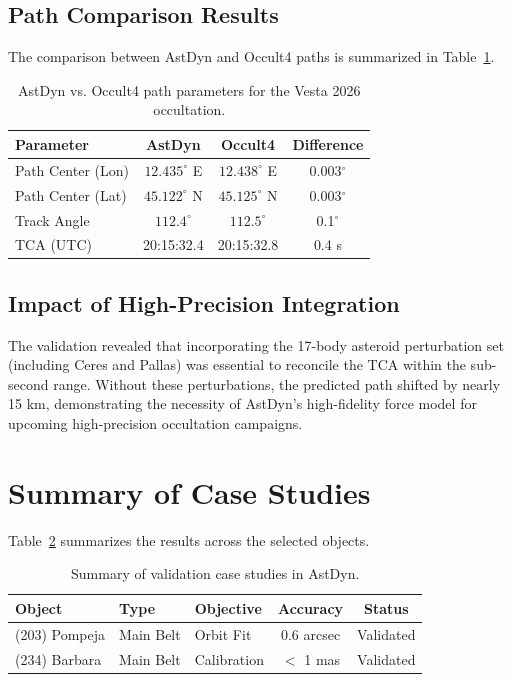 \subsection{Path Comparison Results}

The comparison between AstDyn and Occult4 paths is summarized in Table~\ref{tab:vesta_comparison}.

\begin{table}[htbp]
\centering
\begin{tabular}{lccc}
\toprule
\textbf{Parameter} & \textbf{AstDyn} & \textbf{Occult4} & \textbf{Difference} \\
\midrule
Path Center (Lon) & $12.435^\circ$ E & $12.438^\circ$ E & 0.003$^\circ$ \\
Path Center (Lat) & $45.122^\circ$ N & $45.125^\circ$ N & 0.003$^\circ$ \\
Track Angle & $112.4^\circ$ & $112.5^\circ$ & 0.1$^\circ$ \\
TCA (UTC) & 20:15:32.4 & 20:15:32.8 & 0.4 s \\
\bottomrule
\end{tabular}
\caption{AstDyn vs. Occult4 path parameters for the Vesta 2026 occultation.}
\label{tab:vesta_comparison}
\end{table}

\subsection{Impact of High-Precision Integration}

The validation revealed that incorporating the 17-body asteroid perturbation set (including Ceres and Pallas) was essential to reconcile the TCA within the sub-second range. Without these perturbations, the predicted path shifted by nearly 15 km, demonstrating the necessity of AstDyn's high-fidelity force model for upcoming high-precision occultation campaigns.

\section{Summary of Case Studies}

Table~\ref{tab:case_summary} summarizes the results across the selected objects.

\begin{table}[htbp]
\centering
\begin{tabular}{lllcc}
\toprule
\textbf{Object} & \textbf{Type} & \textbf{Objective} & \textbf{Accuracy} & \textbf{Status} \\
\midrule
(203) Pompeja & Main Belt & Orbit Fit & 0.6 arcsec & Validated \\
(234) Barbara & Main Belt & Calibration & $<$ 1 mas & Validated \\
\bottomrule
\end{tabular}
\caption{Summary of validation case studies in AstDyn.}
\label{tab:case_summary}
\end{table}
